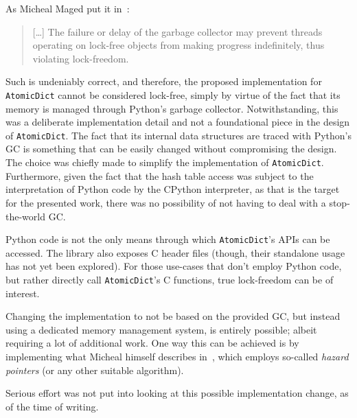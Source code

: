 As Micheal Maged put it in~\cite[\S2.3]{micheal-hash-tables}:
\begin{quote}
[\ldots]
    The failure or delay of the garbage collector may prevent threads operating on lock-free objects from making progress indefinitely, thus violating lock-freedom.
\end{quote}

Such is undeniably correct, and therefore, the proposed implementation for \texttt{AtomicDict} cannot be considered lock-free, simply by virtue of the fact that its memory is managed through Python's garbage collector.
Notwithstanding, this was a deliberate implementation detail and not a foundational piece in the design of \texttt{AtomicDict}.
The fact that its internal data structures are traced with Python's GC is something that can be easily changed without compromising the design.
The choice was chiefly made to simplify the implementation of \texttt{AtomicDict}.
Furthermore, given the fact that the hash table access was subject to the interpretation of Python code by the CPython interpreter, as that is the target for the presented work, there was no possibility of not having to deal with a stop-the-world GC\@.

Python code is not the only means through which \texttt{AtomicDict}'s APIs can be accessed.
The library also exposes C header files (though, their standalone usage has not yet been explored).
For those use-cases that don't employ Python code, but rather directly call \texttt{AtomicDict}'s C functions, true lock-freedom can be of interest.

Changing the implementation to not be based on the provided GC, but instead using a dedicated memory management system, is entirely possible; albeit requiring a lot of additional work.
One way this can be achieved is by implementing what Micheal himself describes in~\cite{micheal-safe-reclamation}, which employs so-called \emph{hazard pointers} (or any other suitable algorithm).

Serious effort was not put into looking at this possible implementation change, as of the time of writing.
